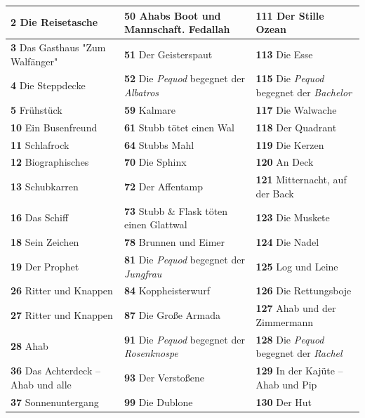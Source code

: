 \documentclass[a5paper,9pt,twoside=false]{extbook}
\begin{document}
\noindent
{\renewcommand{\arraystretch}{1.6}
\begin{tabularx}{\textwidth}{X|X|X}
    \textbf{2} Die Reisetasche & \textbf{50} Ahabs Boot und Mannschaft. Fedallah & \textbf{111} Der Stille Ozean \\\hline%
    \textbf{3} Das Gasthaus "Zum Walfänger" & \textbf{51} Der Geisterspaut & \textbf{113} Die Esse \\ \hline 
    \textbf{4} Die Steppdecke & \textbf{52} Die \textit{Pequod} begegnet der \textit{Albatros} & \textbf{115} Die \textit{Pequod} begegnet der \textit{Bachelor} \\ \hline 
    \textbf{5} Frühstück & \textbf{59} Kalmare & \textbf{117} Die Walwache \\ \hline 
    \textbf{10} Ein Busenfreund & \textbf{61} Stubb tötet einen Wal & \textbf{118} Der Quadrant \\ \hline 
    \textbf{11} Schlafrock & \textbf{64} Stubbs Mahl & \textbf{119} Die Kerzen \\ \hline 
    \textbf{12} Biographisches & \textbf{70} Die Sphinx & \textbf{120} An Deck \\ \hline 
    \textbf{13} Schubkarren & \textbf{72} Der Affentamp & \textbf{121} Mitternacht, auf der Back \\ \hline 
    \textbf{16} Das Schiff & \textbf{73} Stubb \& Flask töten einen Glattwal & \textbf{123} Die Muskete \\ \hline 
    \textbf{18} Sein Zeichen & \textbf{78} Brunnen und Eimer & \textbf{124} Die Nadel \\ \hline 
    \textbf{19} Der Prophet & \textbf{81} Die \textit{Pequod} begegnet der \textit{Jungfrau} & \textbf{125} Log und Leine \\ \hline 
    \textbf{26} Ritter und Knappen & \textbf{84} Koppheisterwurf & \textbf{126} Die Rettungsboje \\ \hline 
    \textbf{27} Ritter und Knappen & \textbf{87} Die Große Armada & \textbf{127} Ahab und der Zimmermann \\ \hline 
    \textbf{28} Ahab & \textbf{91} Die \textit{Pequod} begegnet der \textit{Rosenknospe} & \textbf{128} Die \textit{Pequod} begegnet der \textit{Rachel} \\ \hline 
    \textbf{36} Das Achterdeck -- Ahab und alle & \textbf{93} Der Verstoßene & \textbf{129} In der Kajüte -- Ahab und Pip \\ \hline 
    \textbf{37} Sonnenuntergang & \textbf{99} Die Dublone & \textbf{130} Der Hut \\ \hline 

\end{tabularx}}
\end{document}
